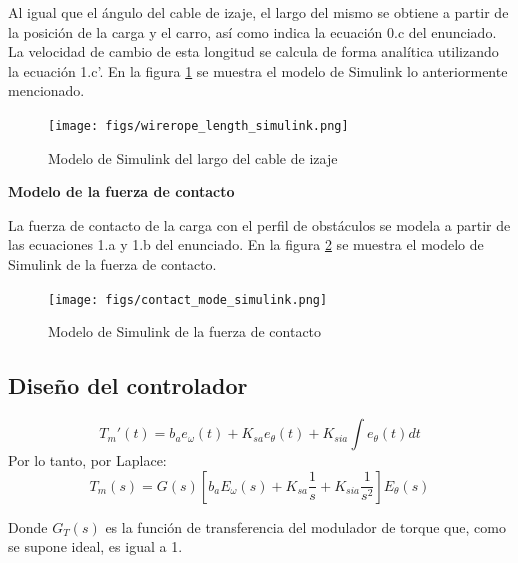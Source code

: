 \documentclass{article}
\begin{document}
            Al igual que el ángulo del cable de izaje, el largo del mismo se obtiene a partir de la posición de la carga y el carro, así como indica la ecuación 0.c del enunciado. La velocidad de cambio de esta longitud se calcula de forma analítica utilizando la ecuación 1.c'. En la figura \ref{fig:wirerope_length_simulink} se muestra el modelo de Simulink lo anteriormente mencionado.

            \begin{figure} [H]
                \centering
                \texttt{[image: figs/wirerope\_length\_simulink.png]}
                \caption{Modelo de Simulink del largo del cable de izaje}
                \label{fig:wirerope_length_simulink}
            \end{figure}

            \textbf{Modelo de la fuerza de contacto}

            La fuerza de contacto de la carga con el perfil de obstáculos se modela a partir de las ecuaciones 1.a y 1.b del enunciado. En la figura \ref{fig:contact_mode_simulink} se muestra el modelo de Simulink de la fuerza de contacto.

            \begin{figure}
                \centering
                \texttt{[image: figs/contact\_mode\_simulink.png]}
                \caption{Modelo de Simulink de la fuerza de contacto}
                \label{fig:contact_mode_simulink}
            \end{figure}




            


                
        \subsection{Diseño del controlador}

            \begin{equation}\label{eq:PID}
                T_m'(t) = b_ae_\omega(t) + K_{sa} e_\theta(t) + K_{sia}\int e_\theta(t) dt
            \end{equation}
            Por lo tanto, por Laplace:
            \begin{equation}\label{eq:PID_Laplace}
                T_m(s) = G(s)[b_aE_\omega(s) + K_{sa} \frac{1}{s} + K_{sia} \frac{1}{s^2}]E_\theta(s)
            \end{equation}

            Donde \(G_T(s)\) es la función de transferencia del modulador de torque que, como se supone ideal, es igual a 1.
\end{document}
